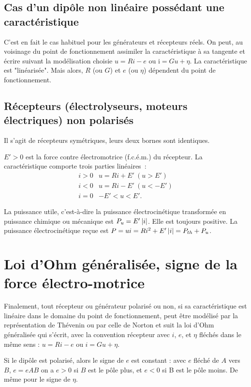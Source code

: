 \subsection{Cas d'un dipôle non linéaire possédant une caractéristique}

C'est en fait le cas habituel pour les générateurs et récepteurs réels. On peut, au voisinage du point de fonctionnement assimiler la caractéristique à sa tangente et écrire suivant la modélisation choisie $u = R i - e$ ou i$ = G u + \eta$. La caractéristique est "linéarisée". Mais alors, $R$ (ou $G$) et $e$ (ou $\eta$) dépendent du point de fonctionnement.
\subsection{Récepteurs (électrolyseurs, moteurs électriques) non polarisés}
Il s'agit de récepteurs symétriques, leurs deux bornes sont identiques.

$E' > 0$ est la force contre électromotrice (f.c.é.m.) du récepteur. La caractéristique comporte trois parties linéaires~:
\begin{align}
i > 0 & u = R i + E' \ (u > E') \\
i < 0 & u  = R i - E' \ (u < -E') \\
i = 0 &  - E' < u < E'.
\end{align}

La puissance utile, c'est-à-dire la puissance électrocinétique transformée en puissance chimique ou mécanique est $P_u = E' \left\lvert i\right\rvert$. Elle est toujours positive. La puissance électrocinétique reçue est $P = u i = R i^2 + E' \left\lvert i\right\rvert = P_{th} + P_u$.

\section{Loi d'Ohm généralisée, signe de la force électro-motrice}
Finalement, tout récepteur ou générateur polarisé ou non, si sa caractéristique est linéaire dans le domaine du point de fonctionnement, peut être modélisé par la représentation de Thévenin ou par celle de Norton et suit la loi d'Ohm généralisée qui s'écrit, avec la convention récepteur avec $i$, $e$, et $\eta$ fléchés dans le même sens : $u = R i - e$ ou $i = G u + \eta$.

Si le dipôle est polarisé, alors le signe de $e$ est constant : avec $e$ fléché de $A$ vers $B$, $e = eAB$ on a $e > 0$ si $B$ est le pôle plus, et $e < 0$ si B est le pôle moins. De même pour le signe de $\eta$.

